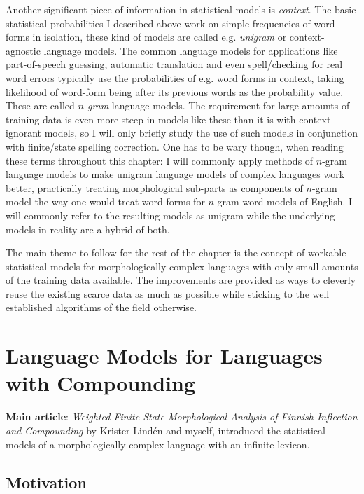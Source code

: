 \documentclass[officiallayout,final]{unihelcompling}
\begin{document}
Another significant piece of information in statistical models is
\emph{context}. The basic statistical probabilities I described above work on
simple frequencies of word forms in isolation, these kind of models are called
e.g. \emph{unigram} or context-agnostic language models. The common language
models for applications like part-of-speech guessing, automatic translation and
even spell\-/checking for real word errors typically use the probabilities of
e.g.  word forms in context, taking likelihood of word-form being after its
previous words as the probability value. These are called \emph{\(n\)-gram}
language models.  The requirement for large amounts of training data is even
more steep in models like these than it is with context-ignorant models, so I
will only briefly study the use of such models in conjunction with finite\-/state
spelling correction. One has to be wary though, when reading these terms
throughout this chapter: I will commonly apply methods of \(n\)-gram language
models to make unigram language models of complex languages work better,
practically treating morphological sub-parts as components of \(n\)-gram model the
way one would treat word forms for \(n\)-gram word models of English. I will
commonly refer to the resulting models as unigram while the underlying models
in reality are a hybrid of both.

The main theme to follow for the rest of the chapter is the concept of workable
statistical models for morphologically complex languages with only small
amounts of the training data available. The improvements are provided as ways
to cleverly reuse the existing scarce data as much as possible while sticking
to the well established algorithms of the field otherwise.

\section{Language Models for Languages with Compounding}
\label{sec:compounding}

\textbf{Main article}: \emph{Weighted Finite-State Morphological Analysis of
Finnish Inflection and Compounding}  by Krister
Lindén and myself, introduced the statistical models of a morphologically
complex language with an infinite lexicon.

\subsection{Motivation}
\end{document}
